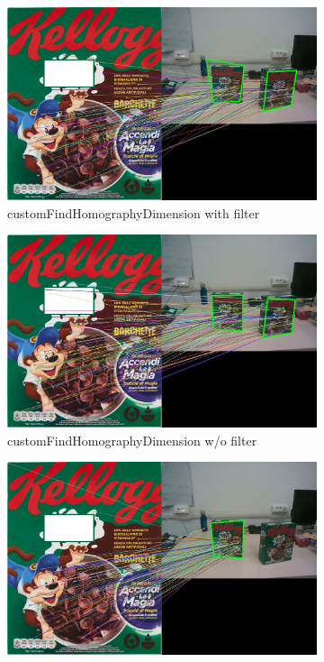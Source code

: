 \documentclass{article}
\begin{document}
\begin{figure}[H]
     \centering
     \begin{subfigure}[b]{0.3\textwidth}
         \centering
         \includegraphics[width=\textwidth]{image/barchette_4_con_filtro.jpg}
         \caption{customFindHomographyDimension with filter}
         \label{fig:customFindHomographyDimension with filter}
     \end{subfigure}
     \hfill
     \begin{subfigure}[b]{0.3\textwidth}
         \centering
         \includegraphics[width=\textwidth]{image/barchette_4_senza_filtro.jpg}
         \caption{customFindHomographyDimension w/o filter}
         \label{fig:customFindHomographyDimension without filter}
     \end{subfigure}
     \hfill
     \begin{subfigure}[b]{0.3\textwidth}
         \centering
         \includegraphics[width=\textwidth]{image/barchette_4_rettangoli.jpg}

\end{subfigure}
\end{figure}
\end{document}
